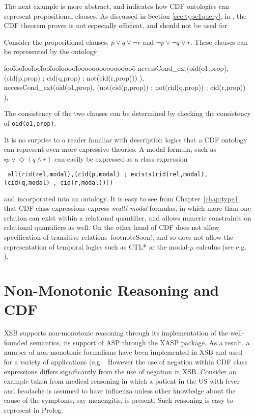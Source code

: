 The next example is more abstract, and indicates how CDF ontologies
can represent propositional clauses.  As discussed in Section
\ref{sec:type1query}, in \version, the CDF theorem prover is not
especially efficient, and should not be used for

\begin{example} \rm
Consider the propositional clauses, $p \vee q \vee \neg r$ and $\neg p
\vee \neg q \vee r$.  These clauses can be represented by the ontology
{\tt  {\small 
\begin{tabbing} foo\=foo\=foo\=foo\=foo\=foo\=foooo\=foooooooooooooooo\=\kill
\> necessCond\_ext(oid(o1,prop), 
	(cid(p,prop) ; cid(q,prop) ; not(cid(r,prop))) ), \\
\> necessCond\_ext(oid(o1,prop), 
	(not(cid(p,prop)) ; not(cid(q,prop)) ; cid(r,prop)) ), \\
\end{tabbing} }}
The consistency of the two clauses can be determined by checking the
consistency of {\tt oid(o1,prop)}.
\end{example}

It is no surprise to a reader familiar with description logics that a
CDF ontology can represent even more expressive theories. A modal
formula, such as $\square p \vee \Diamond (q \wedge r)$ can easily be
expressed as a class expression

{\small {\tt 
all(rid(rel,modal),(cid(p,modal) ; exists(rid(rel,modal),(cid(q,modal) , cid(r,modal)))) } }

and incorporated into an ontology.  It is easy to see from
Chapter~\ref{chap:type1} that CDF class expressions express {\em
  multi-modal} formulas, in which more than one relation can exist
within a relational quantifier, and allows numeric constraints on
relational quantifiers as well.  On the other hand \version{} of CDF
does not allow specification of transitive relations~footnote{Soon!},
and so does not allow the representation of temporal logics such as
CTL* or the modal-$\mu$ calculus (see e.g. \cite{Stir94}).

\section{Non-Monotonic Reasoning and CDF}

XSB supports non-monotonic reasoning through its implementation of the
well-founded semantics, its support of ASP through the XASP package.
As a result, a number of non-monotonic formalisms have been
implemented in XSB and used for a variety of applications
(e.g.~\cite{Swif99a,CuSw02,AlPS03} However the use of negation within
CDF class expressions differs significantly from the use of negation
in XSB.  Consider an example taken from medical reasoning in which a
patient in the US with fever and headache is assumed to have influenza
unless other knowledge about the cause of the symptoms, say
menengitis, is present.  Such reasoning is easy to represent in
Prolog.

